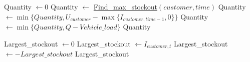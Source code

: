 \documentclass{article}
\begin{document}
\begin{algorithm}[H]
\caption{\textbf{Find\_max\_quantity\_avoid\_stockout$(customer, time)$}} \label{alg:FindMaxQuantityAvoidStockout}
\begin{algorithmic}[1]
\STATE Quantity $\gets 0$
\STATE Quantity $\gets$ \hyperref[alg:FindMaxStockout]{Find\_max\_stockout}$(customer, time)$
\STATE Quantity  $\gets \min\{Quantity, U_{customer} - \max\{I_{customer,time-1},0\}\}$ 
\STATE Quantity $\gets \min \{Quantity, Q - Vehicle\_load\} $
\RETURN Quantity
\end{algorithmic}
\end{algorithm}

\begin{algorithm}[H]
\caption{\textbf{Find\_max\_stockout$(customer, time)$}} \label{alg:FindMaxStockout}
\begin{algorithmic}[1]
\STATE Largest\_stockout $\gets 0$
        \STATE Largest\_stockout $\gets I_{customer,t}$ 
    \ENDIF
\ENDFOR
\STATE Largest\_stockout $\gets -Largest\_stockout$
\RETURN  Largest\_stockout
\end{algorithmic}
\end{algorithm}
\end{document}
